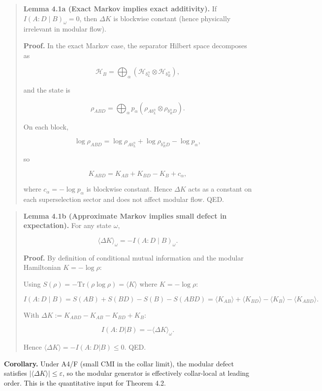 \documentclass[11pt,a4paper]{article}
\theoremstyle{remark}
\begin{document}
\begin{quote}
\textbf{Lemma 4.1a (Exact Markov implies exact additivity).} If
\(I(A:D \mid B)_\omega = 0\), then \(\Delta K\) is blockwise constant (hence
physically irrelevant in modular flow).

\textbf{Proof.} In the exact Markov case, the separator Hilbert space decomposes as

\[
\mathcal H_B = \bigoplus_{\alpha} (\mathcal H_{b_L^{\alpha}} \otimes \mathcal H_{b_R^{\alpha}}),
\]

and the state is

\[
\rho_{ABD} = \bigoplus_{\alpha} p_{\alpha}
(\rho_{A b_L^{\alpha}} \otimes \rho_{b_R^{\alpha} D}).
\]

On each block,

\[
\log \rho_{ABD} = \log \rho_{A b_L^{\alpha}} + \log \rho_{b_R^{\alpha} D} - \log p_{\alpha},
\]

so

\[
K_{ABD} = K_{AB} + K_{BD} - K_B + c_\alpha,
\]

where \(c_\alpha = -\log p_\alpha\) is blockwise constant. Hence \(\Delta K\) acts
as a constant on each superselection sector and does not affect modular flow.
QED.
\end{quote}

\begin{quote}
\textbf{Lemma 4.1b (Approximate Markov implies small defect in expectation).} For
any state \(\omega\),

\[
\langle \Delta K \rangle_\omega = -I(A:D \mid B)_\omega.
\]

\textbf{Proof.} By definition of conditional mutual information and the modular
Hamiltonian \(K = -\log \rho\):

Using \(S(\rho) = -\mathrm{Tr}(\rho \log \rho) = \langle K \rangle\) where
\(K = -\log \rho\):

\[
I(A:D \mid B) = S(AB) + S(BD) - S(B) - S(ABD)
= \langle K_{AB} \rangle + \langle K_{BD} \rangle - \langle K_B \rangle - \langle K_{ABD} \rangle.
\]

With \(\Delta K := K_{ABD} - K_{AB} - K_{BD} + K_B\):

\[
I(A:D|B) = -\langle \Delta K \rangle_\omega.
\]

Hence \(\langle \Delta K \rangle = -I(A:D|B) \le 0\). QED.
\end{quote}

\textbf{Corollary.} Under A4/F (small CMI in the collar limit), the modular defect
satisfies \(|\langle \Delta K \rangle| \le \varepsilon\), so the modular generator
is effectively collar-local at leading order. This is the quantitative input
for Theorem 4.2.
\end{document}
